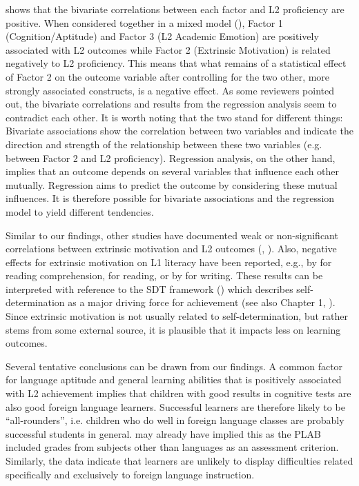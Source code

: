 \documentclass[output=paper]{langsci/langscibook}
\begin{document}
 shows that the bivariate correlations between each factor and L2 proficiency are positive. When considered together in a mixed model (), Factor 1 (Cognition/Aptitude) and Factor 3 (L2 Academic Emotion) are positively associated with L2 outcomes while Factor 2 (Extrinsic Motivation) is related negatively to L2 proficiency. This means that what remains of a statistical effect of Factor 2 on the outcome variable after controlling for the two other, more strongly associated constructs, is a negative effect. As some reviewers pointed out, the bivariate correlations and results from the regression analysis seem to contradict each other. It is worth noting that the two stand for different things: Bivariate associations show the correlation between two variables and indicate the direction and strength of the relationship between these two variables (e.g. between Factor 2 and L2 proficiency). Regression analysis, on the other hand, implies that an outcome depends on several variables that influence each other mutually. Regression aims to predict the outcome by considering these mutual influences. It is therefore possible for bivariate associations and the regression model to yield different tendencies.

Similar to our findings, other studies have documented weak or non-significant correlations between extrinsic motivation and L2 outcomes (\citealt[18]{HusfeldtLehmann2009}, \citealt[31]{KreisEtAl2014}). Also, negative effects for extrinsic motivation on L1 literacy have been reported, e.g., by \citet{WangGuthrie2004} for reading comprehension, \citet{BeckerEtAl2010} for reading, or by \citet{PajaresEtAl2009} for writing. These results can be interpreted with reference to the SDT framework (\citealt{DeciRyan2002}) which describes self-determination as a major driving force for achievement (see also Chapter 1, ). Since extrinsic motivation is not usually related to self-determination, but rather stems from some external source, it is plausible that it impacts less on learning outcomes.

Several tentative conclusions can be drawn from our findings. A common factor for language aptitude and general learning abilities that is positively associated with L2 achievement implies that children with good results in cognitive tests are also good foreign language learners. Successful learners are therefore likely to be “all-rounders”, i.e. children who do well in foreign language classes are probably successful students in general. \citet{Pimsleur1966} may already have implied this as the PLAB included grades from subjects other than languages as an assessment criterion. Similarly, the data indicate that learners are unlikely to display difficulties related specifically and exclusively to foreign language instruction.
\end{document}
